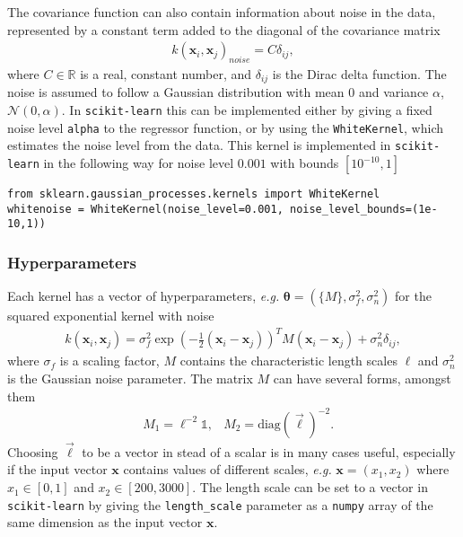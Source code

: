 \documentclass[twoside,english]{uiofysmaster}
\begin{document}
The covariance function can also contain information about noise in the data, represented by a constant term added to the diagonal of the covariance matrix
\begin{align}
k(\textbf{x}_i, \textbf{x}_j)_{noise} = C \delta_{ij},
\end{align}
where $C \in \mathbb{R}$ is a real, constant number, and $\delta_{ij}$ is the Dirac delta function. The noise is assumed to follow a Gaussian distribution with mean $0$ and variance $\alpha$, $\mathcal{N}(0, \alpha)$. In \verb|scikit-learn| this can be implemented either by giving a fixed noise level \verb|alpha| to the regressor function, or by using the \verb|WhiteKernel|, which estimates the noise level from the data. This kernel is implemented in \verb|scikit-learn| in the following way for noise level $0.001$ with bounds $[10^{-10}, 1]$
\begin{lstlisting}
from sklearn.gaussian_processes.kernels import WhiteKernel
whitenoise = WhiteKernel(noise_level=0.001, noise_level_bounds=(1e-10,1))
\end{lstlisting}

\subsubsection{Hyperparameters}

Each kernel has a vector of hyperparameters, \textit{e.g.} $\boldsymbol{\theta} = (\{M\}, \sigma^2_f, \sigma_n^2)$ for the squared exponential kernel with noise
\begin{align}
k(\textbf{x}_i, \textbf{x}_j) = \sigma_f^2 \exp (- \frac{1}{2} (\textbf{x}_i - \textbf{x}_j))^T M (\textbf{x}_i - \textbf{x}_j) + \sigma_n^2 \delta_{ij},
\end{align}
where $\sigma_f$ is a scaling factor, $M$ contains the characteristic length scales $\ell$ and $\sigma_n^2$ is the Gaussian noise parameter. The matrix $M$ can have several forms, amongst them
\begin{align}
&M_1 = \ell^{-2} \mathbb{1} , &M_2 = \text{diag}(\vec{\ell})^{-2}.
\end{align}
Choosing $\vec{\ell}$ to be a vector in stead of a scalar is in many cases useful, especially if the input vector $\textbf{x}$ contains values of different scales, \textit{e.g.} $\textbf{x} = (x_1, x_2)$ where $x_1 \in [0, 1]$ and $x_2 \in [200, 3000]$. The length scale can be set to a vector in \verb|scikit-learn| by giving the \verb|length_scale| parameter as a \verb|numpy| array of the same dimension as the input vector $\textbf{x}$.
\end{document}
